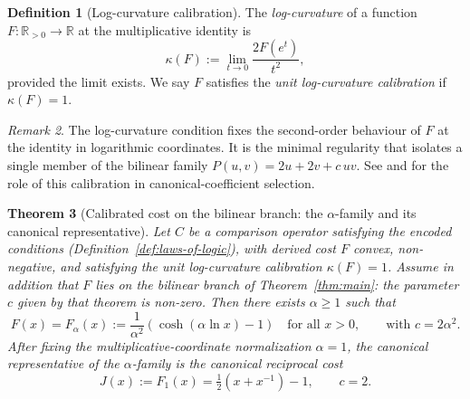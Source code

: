 \documentclass[11pt,a4paper]{article}
\newtheorem{theorem}{Theorem}
\theoremstyle{definition}
\newtheorem{definition}[theorem]{Definition}
\theoremstyle{remark}
\newtheorem{remark}[theorem]{Remark}
\begin{document}
\begin{definition}[Log-curvature calibration]
\label{def:calibration}
The \emph{log-curvature} of a function $F : \mathbb{R}_{>0} \to \mathbb{R}$
at the multiplicative identity is
\[
\kappa(F) := \lim_{t \to 0} \frac{2F(e^t)}{t^2},
\]
provided the limit exists. We say $F$ satisfies the \emph{unit log-curvature
calibration} if $\kappa(F) = 1$.
\end{definition}

\begin{remark}
The log-curvature condition fixes the second-order behaviour of $F$ at the
identity in logarithmic coordinates. It is the minimal regularity that
isolates a single member of the bilinear family
$P(u, v) = 2u + 2v + c\,uv$. See
\cite[Section~5]{WashburnZlatanovicAllahyarov2026} and
\cite[Section~2]{WashburnZlatanovic2026} for the role of this calibration in
canonical-coefficient selection.
\end{remark}

\begin{theorem}[Calibrated cost on the bilinear branch: the $\alpha$-family
and its canonical representative]
\label{thm:cost-corollary}
Let $C$ be a comparison operator satisfying the encoded conditions
(Definition~\ref{def:laws-of-logic}), with derived cost $F$ convex,
non-negative, and satisfying the unit log-curvature calibration
$\kappa(F) = 1$. Assume in addition that $F$ lies on the bilinear
branch of Theorem~\ref{thm:main}: the parameter $c$ given by that
theorem is non-zero. Then there exists $\alpha \geq 1$ such that
\[
F(x) = F_\alpha(x)
     := \frac{1}{\alpha^2}\!\left(\cosh(\alpha \ln x) - 1\right)
\quad \text{for all } x > 0,
\qquad \text{with } c = 2\alpha^2.
\]
After fixing the multiplicative-coordinate normalization $\alpha = 1$,
the canonical representative of the $\alpha$-family is the canonical
reciprocal cost
\[
J(x) := F_1(x) = \tfrac{1}{2}\!\left(x + x^{-1}\right) - 1,
\qquad c = 2.
\]
\end{theorem}
\end{document}
